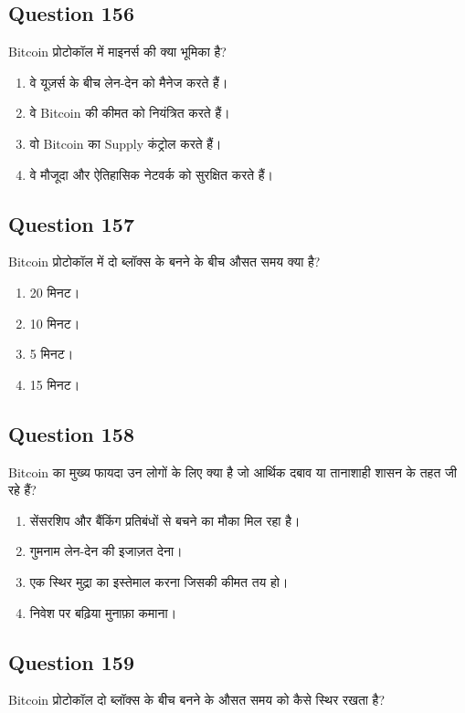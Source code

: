 \documentclass[12pt,a4paper]{article}
\begin{document}
\bigskip


\subsection*{Question 156}
Bitcoin प्रोटोकॉल में माइनर्स की क्या भूमिका है?

\begin{enumerate}[label=\Alph*., leftmargin=*]
\item वे यूज़र्स के बीच लेन-देन को मैनेज करते हैं।
\item वे Bitcoin की कीमत को नियंत्रित करते हैं।
\item वो Bitcoin का Supply कंट्रोल करते हैं।
\item वे मौजूदा और ऐतिहासिक नेटवर्क को सुरक्षित करते हैं।
\end{enumerate}

\bigskip


\subsection*{Question 157}
Bitcoin प्रोटोकॉल में दो ब्लॉक्स के बनने के बीच औसत समय क्या है?

\begin{enumerate}[label=\Alph*., leftmargin=*]
\item 20 मिनट।
\item 10 मिनट।
\item 5 मिनट।
\item 15 मिनट।
\end{enumerate}

\bigskip


\subsection*{Question 158}
Bitcoin का मुख्य फायदा उन लोगों के लिए क्या है जो आर्थिक दबाव या तानाशाही शासन के तहत जी रहे हैं?

\begin{enumerate}[label=\Alph*., leftmargin=*]
\item सेंसरशिप और बैंकिंग प्रतिबंधों से बचने का मौका मिल रहा है।
\item गुमनाम लेन-देन की इजाज़त देना।
\item एक स्थिर मुद्रा का इस्तेमाल करना जिसकी कीमत तय हो।
\item निवेश पर बढ़िया मुनाफ़ा कमाना।
\end{enumerate}

\bigskip


\subsection*{Question 159}
Bitcoin प्रोटोकॉल दो ब्लॉक्स के बीच बनने के औसत समय को कैसे स्थिर रखता है?
\end{document}
